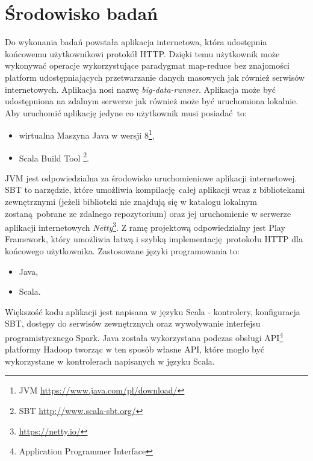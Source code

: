 \section{Środowisko badań}
Do wykonania badań powstała aplikacja internetowa, która udostępnia końcowemu użytkownikowi protokół HTTP. Dzięki temu użytkownik może wykonywać operacje wykorzystujące paradygmat map-reduce bez znajomości platform udostępniających przetwarzanie danych masowych jak również serwisów internetowych. Aplikacja nosi nazwę \textit{big-data-runner}. Aplikacja może być udostępniona na zdalnym serwerze jak również może być uruchomiona lokalnie. Aby uruchomić aplikację jedyne co użytkownik musi posiadać to:
\begin{itemize}
	\item{wirtualna Maszyna Java w wersji 8\footnote{JVM \url{https://www.java.com/pl/download/}}},
	\item{Scala Build Tool \footnote{SBT \url{http://www.scala-sbt.org/}}}.
\end{itemize}
JVM jest odpowiedzialna za środowisko uruchomieniowe aplikacji internetowej. SBT to narzędzie, które umożliwia kompilację całej aplikacji wraz z bibliotekami zewnętrznymi (jeżeli biblioteki nie znajdują się w katalogu lokalnym zostaną pobrane ze zdalnego repozytorium) oraz jej uruchomienie w serwerze aplikacji internetowych \textit{Netty}\footnote{\url{https://netty.io/}}. Z ramę projektową odpowiedzialny jest Play Framework, który umożliwia łatwą i szybką implementację protokołu HTTP dla końcowego użytkownika.
\newpage
Zastosowane języki programowania to:
\begin{itemize}
	\item {Java},
	\item {Scala}.
\end{itemize}

Większość kodu aplikacji jest napisana w języku Scala - kontrolery, konfiguracja SBT, dostępy do serwisów zewnętrznych oraz wywoływanie interfejsu programistycznego Spark. Java została wykorzystana podczas obsługi API\footnote{Application Programmer Interface} platformy Hadoop tworząc w ten sposób własne API, które mogło być wykorzystane w kontrolerach napisanych w języku Scala.

